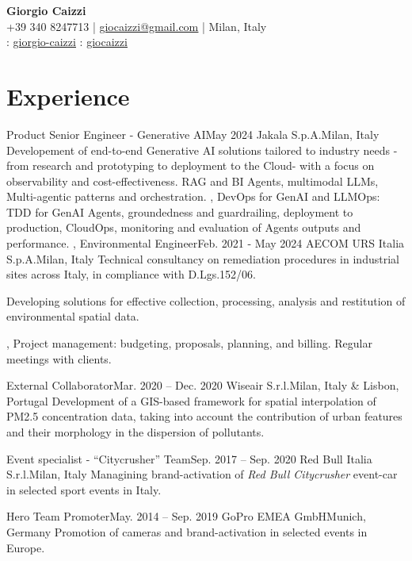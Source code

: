 \documentclass[letterpaper,11pt]{article}
\begin{document}
\begin{center}
  \textbf{\Huge \bfseries Giorgio Caizzi} \\
  \vspace{3pt}
  \small +39 340 8247713 | \href{mailto:giocaizzi@gmail.com}{\underline{giocaizzi@gmail.com}}
  | Milan, Italy\\
  \vspace{3pt}
  \faLinkedinSquare{} : \href{https://linkedin.com/in/giorgio-caizzi/}{\underline{giorgio-caizzi}}
  \faGithubSquare{} : \href{https://www.github.com/giocaizzi/}{\underline{giocaizzi}}\\
\end{center}
\vspace{-30pt}

\section{Experience}
\begin{sectionElementsList}
  \experienceElement
  {Product Senior Engineer - Generative AI}{May 2024}
  {Jakala S.p.A.}{Milan, Italy}
  {
    Developement of end-to-end Generative AI solutions tailored to industry needs -from research and prototyping to deployment to the Cloud- with a focus on observability and cost-effectiveness. 
  }{
    {
      RAG and BI Agents, multimodal LLMs, Multi-agentic patterns and orchestration.
    },
    {
      DevOps for GenAI and LLMOps: TDD for GenAI Agents, groundedness and guardrailing, deployment to production, CloudOps, monitoring and evaluation of Agents outputs and performance.
    },
  }
  \experienceElement
  {Environmental Engineer}{Feb. 2021 - May 2024}
  {AECOM URS Italia S.p.A.}{Milan, Italy}
  {
    Technical consultancy on remediation procedures in industrial sites across Italy, in compliance with D.Lgs.152/06.
  }{
    {
        Developing solutions for effective collection, processing, analysis and restitution of environmental spatial data.

      },
    {
        Project management: budgeting, proposals, planning, and billing. Regular meetings with clients.
      }
  }
  \experienceElement
  {External Collaborator}{Mar. 2020 -- Dec. 2020}
  {Wiseair S.r.l.}{Milan, Italy \& Lisbon, Portugal}
  {
    Development of a GIS-based framework for spatial interpolation of PM2.5 concentration
    data, taking into account the contribution of
    urban features and their morphology in the dispersion of pollutants.
  }
  {}

  \experienceElement
  {Event specialist - “Citycrusher” Team}{Sep. 2017 -- Sep. 2020}
  {Red Bull Italia S.r.l.}{Milan, Italy}
  {Managining brand-activation of \textit{Red Bull Citycrusher} event-car in selected sport
    events in Italy.}
  {}

  \experienceElement
  {Hero Team Promoter}{May. 2014 -- Sep. 2019}
  {GoPro EMEA GmbH}{Munich, Germany}
  {Promotion of cameras and brand-activation in selected events in Europe.}
  {}
\end{sectionElementsList}
\end{document}
